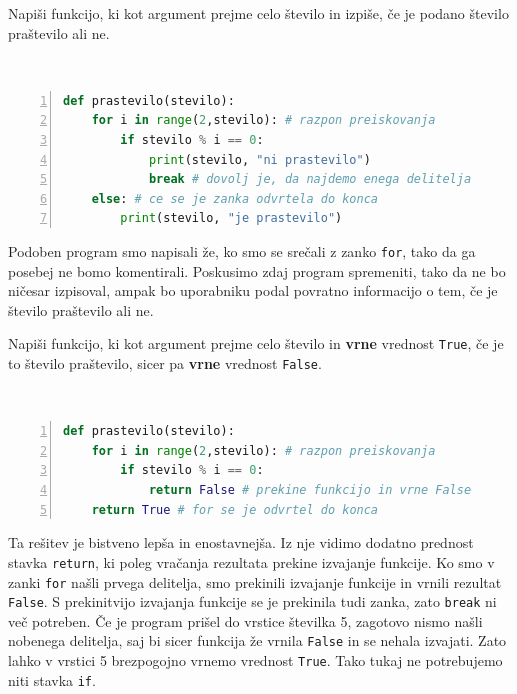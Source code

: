 \begin{zgled}
Napiši funkcijo, ki kot argument prejme celo število in izpiše, če je podano število praštevilo ali ne.
\end{zgled}

\begin{resitev} \  
\begin{lstlisting}[language=Python, showstringspaces=false,numbers=left]
def prastevilo(stevilo):
    for i in range(2,stevilo): # razpon preiskovanja
        if stevilo % i == 0:
            print(stevilo, "ni prastevilo")
            break # dovolj je, da najdemo enega delitelja
    else: # ce se je zanka odvrtela do konca
        print(stevilo, "je prastevilo")   
\end{lstlisting}
\end{resitev}
Podoben program smo napisali že, ko smo se srečali z zanko \texttt{for}, tako da ga posebej ne bomo komentirali. Poskusimo zdaj program spremeniti, tako da ne bo ničesar izpisoval, ampak bo uporabniku podal povratno informacijo o tem, če je število praštevilo ali ne.
\begin{zgled}
Napiši funkcijo, ki kot argument prejme celo število in \textbf{vrne} vrednost \texttt{True}, če je to število praštevilo, sicer pa \textbf{vrne} vrednost \texttt{False}.
\end{zgled}
\begin{resitev} \  
\begin{lstlisting}[language=Python, showstringspaces=false,numbers=left]
def prastevilo(stevilo):
    for i in range(2,stevilo): # razpon preiskovanja
        if stevilo % i == 0:
            return False # prekine funkcijo in vrne False
    return True # for se je odvrtel do konca
\end{lstlisting}
\end{resitev}
Ta rešitev je bistveno lepša in enostavnejša. Iz nje vidimo dodatno prednost stavka \texttt{return}, ki poleg vračanja rezultata prekine izvajanje funkcije. Ko smo v zanki \texttt{for} našli prvega delitelja, smo prekinili izvajanje funkcije in vrnili rezultat \texttt{False}. S prekinitvijo izvajanja funkcije se je prekinila tudi zanka, zato \texttt{break} ni več potreben. Če je program prišel do vrstice številka 5, zagotovo nismo našli nobenega delitelja, saj bi sicer funkcija že vrnila \texttt{False} in se nehala izvajati. Zato lahko v vrstici 5 brezpogojno vrnemo vrednost \texttt{True}. Tako tukaj ne potrebujemo niti stavka \texttt{if}.

